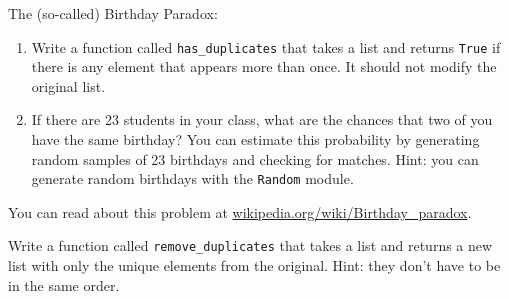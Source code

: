 \documentclass[10pt]{book}
\begin{document}
\begin{ex}
\label{duplicate}

The (so-called) Birthday Paradox:

\begin{enumerate}


\item Write a function called \verb"has_duplicates" that takes
a list and returns {\tt True} if there is any element that
appears more than once.  It should not modify the original
list.

\item If there are 23 students in your class, what are the chances
that two of you have the same birthday?  You can estimate this
probability by generating random samples of 23 birthdays
and checking for matches.
Hint: you can generate random birthdays with the {\tt Random} module.


\end{enumerate}

You can read about this problem at
\url{wikipedia.org/wiki/Birthday_paradox}.%

\end{ex}


\begin{ex}


Write a function called \verb"remove_duplicates" that takes
a list and returns a new list with only the unique elements from
the original. Hint: they don't have to be in the same order.
\end{ex}


% 
% 
% 
\end{document}
